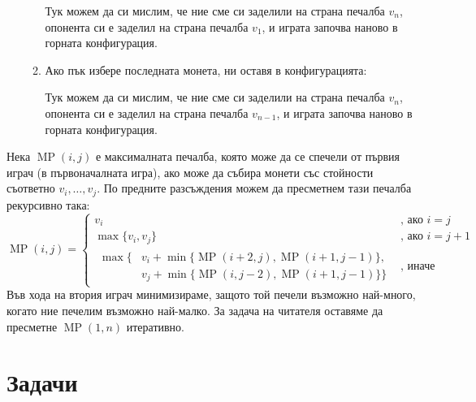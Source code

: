 \begin{enumerate}
\begin{enumerate}
\begin{center}
                          \dt{$\dots$}  
                    \end{center}
                    Тук можем да си мислим, че ние сме си заделили на страна печалба $v_n$, опонента си е заделил на страна печалба $v_1$, и играта започва наново в горната конфигурация.
              \item Ако пък избере последната монета, ни оставя в конфигурацията:
                    \begin{center}
                          \dt{$\dots$}  
                    \end{center}
                    Тук можем да си мислим, че ние сме си заделили на страна печалба $v_n$, опонента си е заделил на страна печалба $v_{n - 1}$, и играта започва наново в горната конфигурация.
          \end{enumerate}
\end{enumerate}

Нека $\operatorname{MP}(i, j)$ е максималната печалба, която може да се спечели от първия играч (в първоначалната игра), ако може да събира монети със стойности съответно $v_i, \dots, v_j$.
По предните разсъждения можем да пресметнем тази печалба рекурсивно така:
\[
    \operatorname{MP}(i, j) = \begin{cases}
        v_i                                                                                         & \text{, ако } i = j     \\
        \max \{ v_i, v_j\}                                                                          & \text{, ако } i = j + 1 \\
        \!\begin{aligned}
              \max \{ & v_i + \min \{ \operatorname{MP}(i + 2, j), \operatorname{MP}(i + 1, j - 1) \}, \\
                      & v_j + \min \{ \operatorname{MP}(i, j - 2), \operatorname{MP}(i + 1, j - 1) \}
              \}
          \end{aligned} & \text{, иначе}
    \end{cases}
\]
Във хода на втория играч минимизираме, защото той печели възможно най-много, когато ние печелим възможно най-малко.
За задача на читателя оставяме да пресметне $\operatorname{MP}(1, n)$ итеративно.

\section{Задачи}

